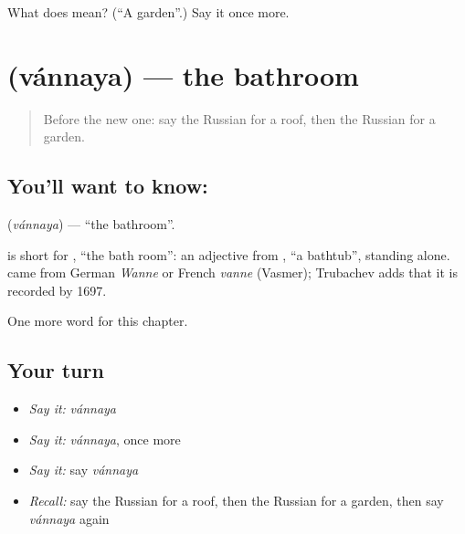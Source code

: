 \begin{tcolorbox}[breakable,colback=teal!4,colframe=teal!35!black,title={Before you move on}]
What does  mean? (\textquotedblleft{}A garden\textquotedblright{}.) Say it once more.
\end{tcolorbox}
\section[\texorpdfstring{\ru{ванная} (vánnaya)}{ванная (vánnaya)}]{ (vánnaya) — the bathroom}

\label{lesson:RU-C50-bathroom}



\begin{quote}
Before the new one: say the Russian for a roof, then the Russian for a garden.
\end{quote}

\subsection*{You'll want to know: }
\textbf{} (\emph{vánnaya}) — \textquotedblleft{}the bathroom\textquotedblright{}.

\begin{cousinweb}
\textbf{} is short for \emph{ }, \textquotedblleft{}the bath room\textquotedblright{}: an adjective from \emph{}, \textquotedblleft{}a bathtub\textquotedblright{}, standing alone. \emph{} came from German \emph{Wanne} or French \emph{vanne} (Vasmer); Trubachev adds that it is recorded by 1697.
\end{cousinweb}

\begin{grammarlens}[title={What you've built}]
One more word for this chapter.
\end{grammarlens}

\subsection*{Your turn}
\begin{itemize}
\raggedright
  \item \emph{Say it:} \emph{vánnaya}
  \item \emph{Say it:} \emph{vánnaya}, once more
  \item \emph{Say it:} say \emph{vánnaya}
  \item \emph{Recall:} say the Russian for a roof, then the Russian for a garden, then say \emph{vánnaya} again
\end{itemize}

